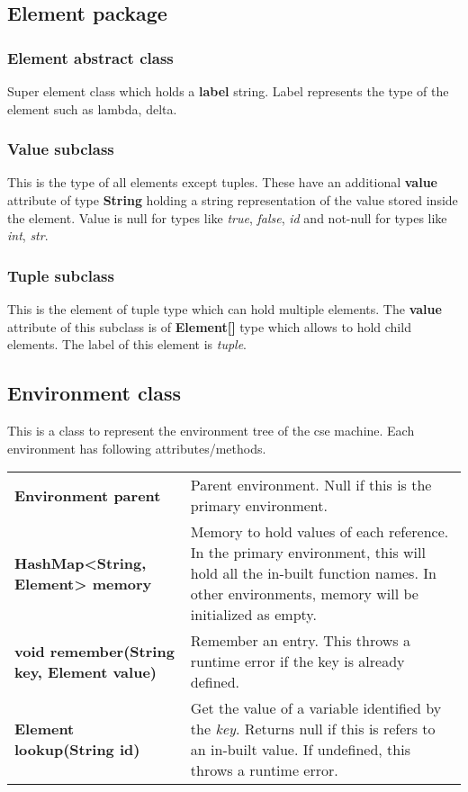 \documentclass[12pt,a4paper]{article}
\begin{document}
\subsection{Element package}

\subsubsection{Element abstract class}

Super element class which holds a \textbf{label} string. Label represents the type of the element such as lambda, delta.

\subsubsection{Value subclass}

This is the type of all elements except tuples. These have an additional \textbf{value} attribute of type \textbf{String} holding a string representation of the value stored inside the element. Value is null for types like \textit{true}, \textit{false}, \textit{id} and not-null for types like \textit{int}, \textit{str}.

\subsubsection{Tuple subclass}

This is the element of tuple type which can hold multiple elements. The \textbf{value} attribute of this subclass is of \textbf{Element[]} type which allows to hold child elements. The label of this element is \textit{tuple}.\\

\subsection{Environment class}

This is a class to represent the environment tree of the cse machine. Each environment has following attributes/methods. \\

    \begin{tabular}{lp{9cm}}
        \textbf{Environment parent} & Parent environment. Null if this is the primary environment. \\
        \textbf{HashMap<String, Element> memory} & Memory to hold values of each reference. In the primary environment, this will hold all the in-built function names. In other environments, memory will be initialized as empty. \\
        \textbf{void remember(String key, Element value)} & Remember an entry. This throws a runtime error if the key is already defined. \\
        \textbf{Element lookup(String id)} &  Get the value of a variable identified by the \textit{key}. Returns null if this is refers to an in-built value. If undefined, this throws a runtime error.\\
    \end{tabular} \\
\end{document}
